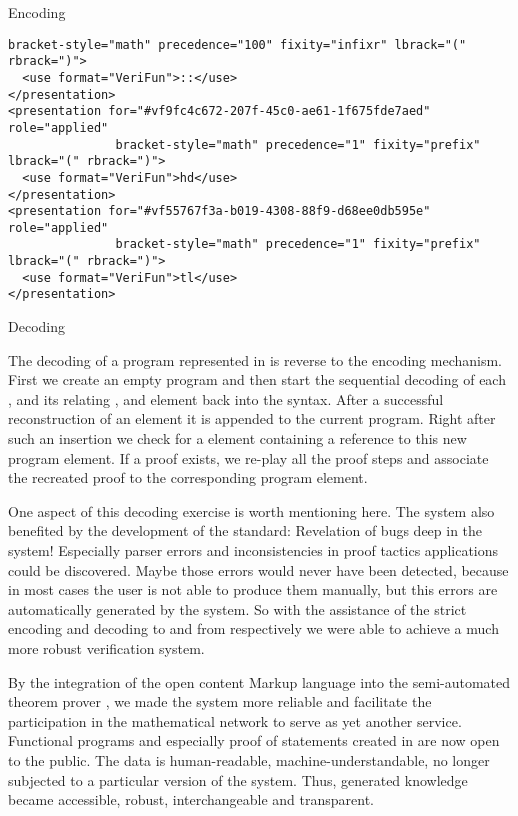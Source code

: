 \begin{omgroup}[id=verifun,short=VeriFun,creators={nmueller}]
\begin{omgroup}{Encoding}
\begin{lstlisting}[escapechar=\%,mathescape,label=lst:omdoc:pres,caption={Representation of {\verifun} names to {\omdoc}}]
               bracket-style="math" precedence="100" fixity="infixr" lbrack="(" rbrack=")">
  <use format="VeriFun">::</use>
</presentation>
<presentation for="#vf9fc4c672-207f-45c0-ae61-1f675fde7aed" role="applied"
               bracket-style="math" precedence="1" fixity="prefix" lbrack="(" rbrack=")">
  <use format="VeriFun">hd</use>
</presentation>
<presentation for="#vf55767f3a-b019-4308-88f9-d68ee0db595e" role="applied"
               bracket-style="math" precedence="1" fixity="prefix" lbrack="(" rbrack=")">
  <use format="VeriFun">tl</use>
</presentation>
\end{lstlisting}  
\end{omgroup}

\begin{omgroup}{Decoding}

The decoding of a {\verifun} program represented in {\omdoc} is reverse to the encoding
mechanism. First we create an empty program and then start the sequential decoding of each
{}, {} and its relating {}, and
{} element back into the {\fp} syntax. After a successful
reconstruction of an element it is appended to the current program. Right after such an
insertion we check for a {} element containing a reference to this new
program element. If a proof exists, we re-play all the proof steps and associate the
recreated {\verifun} proof to the corresponding program element.

One aspect of this decoding exercise is worth mentioning here. The {\verifun} system also
benefited by the development of the {\omdoc} standard: Revelation of bugs deep in the
system! Especially {\fp} parser errors and inconsistencies in proof tactics applications
could be discovered. Maybe those errors would never have been detected, because in most
cases the user is not able to produce them manually, but this errors are automatically
generated by the system. So with the assistance of the strict encoding and decoding to and
from {\omdoc} respectively we were able to achieve a much more robust verification system.

By the integration of the open content Markup language {\omdoc} into the semi-automated
theorem prover {\verifun}, we made the system more reliable and facilitate the
participation in the mathematical network to serve as yet another service. Functional
programs and especially proof of statements created in {\verifun} are now open to the
public. The data is human-readable, machine-understandable, no longer subjected to a
particular version of the system. Thus, {\verifun} generated knowledge became accessible,
robust, interchangeable and transparent.
\end{omgroup}
\end{omgroup}

